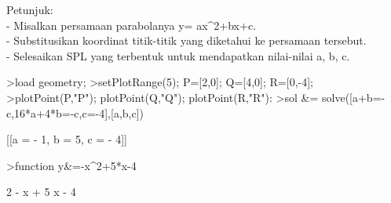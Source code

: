 \documentclass[a4paper,10pt]{article}
\begin{document}
\begin{eulernotebook}
\begin{eulercomment}
\begin{eulercomment}
\begin{eulercomment}
Petunjuk:\\
- Misalkan persamaan parabolanya y= ax\textasciicircum{}2+bx+c.\\
- Substitusikan koordinat titik-titik yang diketahui ke persamaan
tersebut.\\
- Selesaikan SPL yang terbentuk untuk mendapatkan nilai-nilai a, b, c.
\end{eulercomment}
\begin{eulerprompt}
>load geometry;
>setPlotRange(5); P=[2,0]; Q=[4,0]; R=[0,-4];
>plotPoint(P,"P"); plotPoint(Q,"Q"); plotPoint(R,"R"):
>sol &= solve([a+b=-c,16*a+4*b=-c,c=-4],[a,b,c])
\end{eulerprompt}
\begin{euleroutput}
  
                       [[a = - 1, b = 5, c = - 4]]
  
\end{euleroutput}
\begin{eulerprompt}
>function y&=-x^2+5*x-4
\end{eulerprompt}
\begin{euleroutput}
  
                                 2
                              - x  + 5 x - 4
  

\end{euleroutput}
\end{eulercomment}
\end{eulercomment}
\end{eulernotebook}
\end{document}
